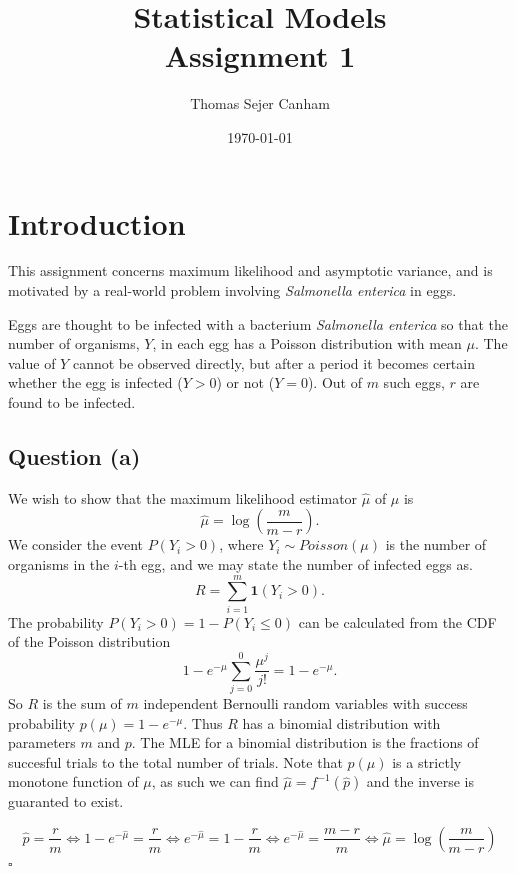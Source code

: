 \documentclass{article}
\title{Statistical Models\\Assignment 1}
\author{Thomas Sejer Canham}
\date{\today}
\theoremstyle{definition}
\theoremstyle{remark}
\begin{document}
\maketitle

\section*{Introduction}

This assignment concerns maximum likelihood and asymptotic variance, and is motivated
by a real-world problem involving \textit{Salmonella enterica} in eggs.

Eggs are thought to be infected with a bacterium \textit{Salmonella enterica} so that
the number of organisms, $Y$, in each egg has a Poisson distribution with mean $\mu$.
The value of $Y$ cannot be observed directly, but after a period it becomes certain
whether the egg is infected ($Y>0$) or not ($Y=0$). Out of $m$ such eggs, $r$ are found
to be infected.


\subsection*{Question (a)} We wish to show that the maximum likelihood estimator $\hat{\mu}$ of $\mu$ is
\[
    \hat{\mu}
    =
    \log\left(\frac{m}{m-r}\right).
\]
We consider the event $P(Y_i > 0)$, where $Y_i \sim Poisson(\mu)$ is the number of organisms in the $i$-th egg, and we may state the number of infected eggs as.
\[
    R = \sum_{i=1}^{m} \mathbf{1}(Y_i>0).
\]
The probability $P(Y_i>0) = 1 - P(Y_i \leq 0)$ can be calculated from the CDF of the Poisson distribution
\[
 1 - e^{-\mu}\sum_{j=0}^0 \frac{ \mu^j}{j!} = 1 - e^{-\mu}.
\]
So $R$ is the sum of $m$ independent Bernoulli random variables with success probability $p(\mu) = 1 - e^{-\mu}$. Thus $R$ has a binomial distribution with parameters $m$ and $p$. The MLE for a binomial distribution is the fractions of succesful trials to the total number of trials. Note that $p(\mu)$ is a strictly monotone function of $\mu$, as such we can find $\hat \mu = f^{-1}(\hat p)$ and the inverse is guaranted to exist.


\begin{equation}
    \hat p = \dfrac{r}{m} \iff 1 - e^{-\hat \mu} = \dfrac{r}{m} \iff e^{-\hat \mu} = 1-\dfrac{r}{m} \iff e^{-\hat \mu} = \dfrac{m-r}{m} \iff \hat \mu = \log(\dfrac{m}{m-r})
\end{equation}
$\square$
\end{document}
